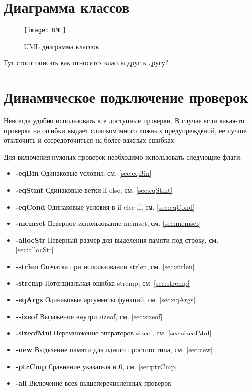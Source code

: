 \section{Диаграмма классов}
\begin{figure}[H]
\centering
\texttt{[image: UML]}
\caption{UML диаграмма классов}%
\label{fig:UML}
\end{figure}

Тут стоит описать как относятся классы друг к другу?

\section{Динамическое подключение проверок}
Невсегда удобно использовать все доступные проверки. В случае если какая-то проверка на ошибки
выдает слишком много ложных предупреждений, ее лучше отключить и сосредоточиться на более важных
ошибках. 

Для включения нужных проверок необходимо использовать следующие флаги:
\begin{itemize}
	\item \textbf{-eqBin}	Одинаковые условия, см. \ref{sec:eqBin}
	\item \textbf{-eqStmt}	Одинаковые ветки if-else, см. \ref{sec:eqStmt}
	\item \textbf{-eqCond}	Одинаковые условия в if-else-if, см. \ref{sec:eqCond}
	\item \textbf{-memset}	Неверное использование memset, см. \ref{sec:memset}
	\item \textbf{-allocStr}	Неверный размер для выделения памяти под строку, см. \ref{sec:allocStr}
	\item \textbf{-strlen}	Опечатка при использовании strlen, см. \ref{sec:strlen}
	\item \textbf{-strcmp}	Потенциальная ошибка strcmp, см. \ref{sec:strcmp}
	\item \textbf{-eqArgs}	Одинаковые аргументы функций, см. \ref{sec:eqArgs}
	\item \textbf{-sizeof}	Выражение внутри sizeof, см. \ref{sec:sizeof}
	\item \textbf{-sizeofMul}	Перемножение операторов sizeof, см. \ref{sec:sizeofMul}
	\item \textbf{-new}		Выделение памяти для одного простого типа, см. \ref{sec:new}
	\item \textbf{-ptrCmp}	Сравнение указателя и 0, см. \ref{sec:ptrCmp}
	\item \textbf{-all}		Включение всех вышеперечисленных проверок
\end{itemize}

